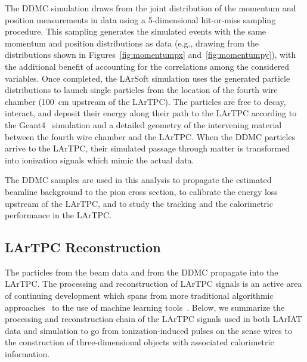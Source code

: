 \documentclass[%
 floatfix,
 reprint,
 twocolumn,
superscriptaddress,
showpacs,preprintnumbers,
 amsmath,amssymb,
 aps,
prd,
]{revtex4-1}
\begin{document}
The DDMC simulation draws from the joint distribution of the momentum and position measurements in data using a 5-dimensional hit-or-miss sampling procedure. This sampling generates the simulated events  with the same momentum and position distributions as data (e.g., drawing from the distributions shown in Figures~\ref{fig:momentumpx} and~\ref{fig:momentumpy}), with the additional benefit of accounting for the correlations among the considered variables. Once completed, the LArSoft simulation uses the generated particle distributions to launch single particles from the location of the fourth wire chamber (100~cm upstream of the LArTPC). The particles are free to decay, interact, and deposit their energy along their path to the LArTPC according to the Geant4~\cite{Geant4} simulation and a detailed geometry of the intervening material between the fourth wire chamber and the LArTPC. When the DDMC particles arrive to the LArTPC, their simulated passage through matter is transformed into ionization signals which mimic the actual data. 

The DDMC samples are used in this analysis to propagate the estimated beamline background to the pion cross section, to calibrate the energy loss upstream of the LArTPC, and to study the tracking and the calorimetric performance in the LArTPC. 



\subsection{\label{sec:TPCReco}LArTPC Reconstruction}
The particles from the beam data and from the DDMC propagate into the LArTPC. The processing and reconstruction of LArTPC signals is an active area of continuing development which spans from more traditional algorithmic approaches~\cite{Barker2011} to the use of machine learning tools~\cite{1748-0221-12-03-P03011}. Below, we summarize the processing and reconstruction chain of the LArTPC signals used in both LArIAT data and simulation to go from ionization-induced pulses on the sense wires to the construction of three-dimensional objects with associated calorimetric information. 

\end{document}
